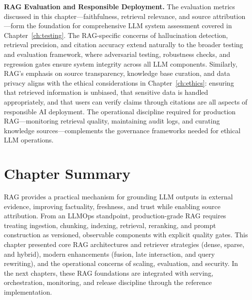 \medskip
\noindent\textbf{RAG Evaluation and Responsible Deployment.} The evaluation metrics discussed in this chapter---faithfulness, retrieval relevance, and source attribution---form the foundation for comprehensive LLM system assessment covered in Chapter~\ref{ch:testing}. The RAG-specific concerns of hallucination detection, retrieval precision, and citation accuracy extend naturally to the broader testing and evaluation framework, where adversarial testing, robustness checks, and regression gates ensure system integrity across all LLM components. Similarly, RAG's emphasis on source transparency, knowledge base curation, and data privacy aligns with the ethical considerations in Chapter~\ref{ch:ethics}: ensuring that retrieved information is unbiased, that sensitive data is handled appropriately, and that users can verify claims through citations are all aspects of responsible AI deployment. The operational discipline required for production RAG---monitoring retrieval quality, maintaining audit logs, and curating knowledge sources---complements the governance frameworks needed for ethical LLM operations.

\section*{Chapter Summary}
RAG provides a practical mechanism for grounding LLM outputs in external evidence, improving factuality, freshness, and trust while enabling source attribution.
From an LLMOps standpoint, production-grade RAG requires treating ingestion, chunking, indexing, retrieval, reranking, and prompt construction as versioned, observable components with explicit quality gates.
This chapter presented core RAG architectures and retriever strategies (dense, sparse, and hybrid), modern enhancements (fusion, late interaction, and query rewriting), and the operational concerns of scaling, evaluation, and security.
In the next chapters, these RAG foundations are integrated with serving, orchestration, monitoring, and release discipline through the \ishtar{} reference implementation.

\printbibliography[
  heading=subbibliography,
  segment=\therefsegment,
  resetnumbers=true
]
